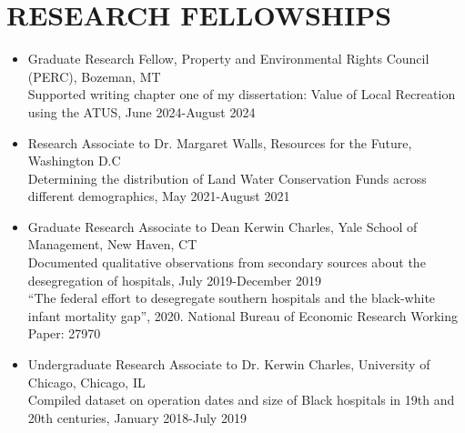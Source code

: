 \documentclass[11pt]{article}
\begin{document}
\section*{RESEARCH FELLOWSHIPS}
\begin{itemize}[left=0pt]
    \item Graduate Research Fellow, Property and Environmental Rights Council (PERC), Bozeman, MT \\
    Supported writing chapter one of my dissertation: Value of Local Recreation using the ATUS, June 2024-August 2024
    \item Research Associate to Dr. Margaret Walls, Resources for the Future, Washington D.C \\
    Determining the distribution of Land Water Conservation Funds across different demographics, May 2021-August 2021
    \item Graduate Research Associate to Dean Kerwin Charles, Yale School of Management, New Haven, CT \\
    Documented qualitative observations from secondary sources about the desegregation of hospitals, July 2019-December 2019 \\
    “The federal effort to desegregate southern hospitals and the black-white infant mortality gap”, 2020. National Bureau of Economic Research Working Paper: 27970
    \item Undergraduate Research Associate to Dr. Kerwin Charles, University of Chicago, Chicago, IL \\
    Compiled dataset on operation dates and size of Black hospitals in 19th and 20th centuries, January 2018-July 2019
\end{itemize}
\end{document}
